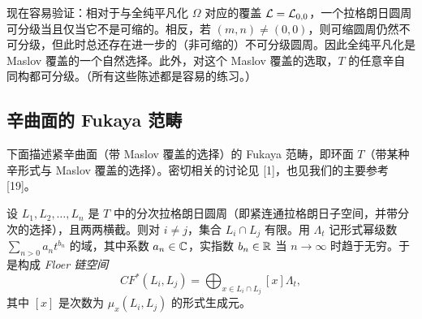 
现在容易验证：相对于与全纯平凡化 $\Omega$ 对应的覆盖 $\mathcal{L}=\mathcal{L}_{0,0}$，一个拉格朗日圆周可分级当且仅当它不是可缩的。相反，若 $(m,n)\ne(0,0)$，则可缩圆周仍然不可分级，但此时总还存在进一步的（非可缩的）不可分级圆周。因此全纯平凡化是 Maslov 覆盖的一个自然选择。此外，对这个 Maslov 覆盖的选取，$T$ 的任意辛自同构都可分级。（所有这些陈述都是容易的练习。）



\subsection{辛曲面的 Fukaya 范畴}
\label{subsec:fuk-surface}

下面描述紧辛曲面（带 Maslov 覆盖的选择）的 Fukaya 范畴，即环面 $T$（带某种辛形式与 Maslov 覆盖的选择）。密切相关的讨论见 [1]，也见我们的主要参考 [19]。


设 $L_1,L_2,\dots,L_n$ 是 $T$ 中的分次拉格朗日圆周（即紧连通拉格朗日子空间，并带分次的选择），且两两横截。则对 $i\ne j$，集合 $L_i\cap L_j$ 有限。用 $\Lambda_t$ 记形式幂级数 $\sum_{n>0}a_n t^{b_n}$ 的域，其中系数 $a_n\in\mathbb{C}$，实指数 $b_n\in\mathbb{R}$ 当 $n\to\infty$ 时趋于无穷。于是构成 \emph{Floer 链空间}
\[
  CF^*(L_i,L_j) = \bigoplus_{x\in L_i\cap L_j} [x]\Lambda_t,
\]
其中 $[x]$ 是次数为 $\mu_x(L_i,L_j)$ 的形式生成元。

